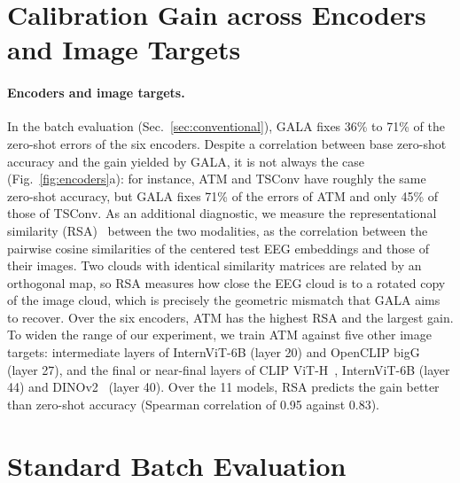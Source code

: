 \documentclass[10pt,twocolumn,letterpaper]{article}
\begin{document}
\section{Calibration Gain across Encoders and Image Targets}
\label{app:encoders}

\paragraph{Encoders and image targets.}
In the batch evaluation (Sec.~\ref{sec:conventional}), GALA fixes 36\% to 71\% of the zero-shot errors of the six encoders. Despite a correlation between base zero-shot accuracy and the gain yielded by GALA, it is not always the case (Fig.~\ref{fig:encoders}a): for instance, ATM and TSConv have roughly the same zero-shot accuracy, but GALA fixes 71\% of the errors of ATM and only 45\% of those of TSConv. As an additional diagnostic, we measure the representational similarity (RSA)~\cite{kriegeskorte2008rsa} between the two modalities, as the correlation between the pairwise cosine similarities of the centered test EEG embeddings and those of their images. Two clouds with identical similarity matrices are related by an orthogonal map, so RSA measures how close the EEG cloud is to a rotated copy of the image cloud, which is precisely the geometric mismatch that GALA aims to recover. Over the six encoders, ATM has the highest RSA and the largest gain. To widen the range of our experiment, we train ATM against five other image targets: intermediate layers of InternViT-6B (layer 20) and OpenCLIP bigG~\cite{cherti2023openclip} (layer 27), and the final or near-final layers of CLIP ViT-H~\cite{radford2021clip}, InternViT-6B (layer 44) and DINOv2~\cite{oquab2024dinov2} (layer 40). Over the 11 models, RSA predicts the gain better than zero-shot accuracy (Spearman correlation of 0.95 against 0.83).


\section{Standard Batch Evaluation}
\label{app:batch}
\end{document}
